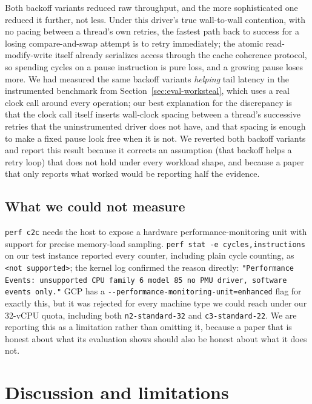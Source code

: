 \documentclass[10pt,journal,compsoc]{IEEEtran}
\begin{document}
Both backoff variants reduced raw throughput, and the more sophisticated one reduced it further,
not less. Under this driver's true wall-to-wall contention, with no pacing between a thread's own
retries, the fastest path back to success for a losing compare-and-swap attempt is to retry
immediately; the atomic read-modify-write itself already serializes access through the cache
coherence protocol, so spending cycles on a pause instruction is pure loss, and a growing pause
loses more. We had measured the same backoff variants \emph{helping} tail latency in the
instrumented benchmark from Section~\ref{sec:eval-worksteal}, which uses a real clock call around
every operation; our best explanation for the discrepancy is that the clock call itself inserts
wall-clock spacing between a thread's successive retries that the uninstrumented driver does not
have, and that spacing is enough to make a fixed pause look free when it is not. We reverted both
backoff variants and report this result because it corrects an assumption (that backoff helps a
retry loop) that does not hold under every workload shape, and because a paper that only reports
what worked would be reporting half the evidence.

\subsection{What we could not measure}

\texttt{perf c2c} needs the host to expose a hardware performance-monitoring unit with support for
precise memory-load sampling. \texttt{perf stat -e cycles,instructions} on our test instance
reported every counter, including plain cycle counting, as \texttt{<not supported>}; the kernel log
confirmed the reason directly: \texttt{"Performance Events: unsupported CPU family 6 model 85 no
PMU driver, software events only."} GCP has a
\texttt{-{}-performance-monitoring-unit=enhanced}
flag for exactly this, but it was rejected for every machine type we could reach under our 32-vCPU
quota, including both \texttt{n2-standard-32} and \texttt{c3-standard-22}. We are reporting this as
a limitation rather than omitting it, because a paper that is honest about what its evaluation shows
should also be honest about what it does not.

\section{Discussion and limitations}
\label{sec:discussion}
\end{document}
